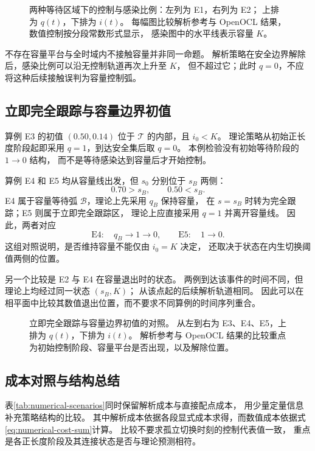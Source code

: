 \begin{figure}[H]
\centering
{}
\caption{两种等待区域下的控制与感染比例：左列为 E1，右列为 E2；
上排为 $q(t)$，下排为 $i(t)$。
每幅图比较解析参考与 OpenOCL 结果，数值控制按分段常数形式显示，
感染图中的水平线表示容量 $K$。}
\label{fig:numerical-waiting}
\end{figure}

\NumFindingParagraph{\NumFindingWaiting}

不存在容量平台与全时域内不接触容量并非同一命题。
解析策略在安全边界解除后，感染比例可以沿无控制轨道再次上升至 $K$，
但不超过它；此时 $q=0$，不应将这种后续接触误判为容量控制弧。

\subsection{立即完全跟踪与容量边界初值}

算例 E3 的初值 $(0.50,0.14)$ 位于 $\mathcal T$ 的内部，且 $i_0<K$。
理论策略从初始正长度阶段起即采用 $q=1$，到达安全集后取 $q=0$。
本例检验没有初始等待阶段的 $1\to0$ 结构，
而不是等待感染达到容量后才开始控制。

算例 E4 和 E5 均从容量线出发，但 $s_0$ 分别位于 $s_B$ 两侧：
\[
 0.70>s_B,\qquad 0.50<s_B.
\]
E4 属于容量等待弧 $\mathcal B$，理论上先采用 $q_B$ 保持容量，
在 $s=s_B$ 时转为完全跟踪；E5 则属于立即完全跟踪区，
理论上应直接采用 $q=1$ 并离开容量线。
因此，两者对应
\[
 \mathrm{E4}:\quad q_B\to1\to0,
 \qquad
 \mathrm{E5}:\quad 1\to0.
\]
这组对照说明，是否维持容量不能仅由 $i_0=K$ 决定，
还取决于状态在内生切换阈值两侧的位置。

另一个比较是 E2 与 E4 在容量退出时的状态。
两例到达该事件的时间不同，但理论上均经过同一状态 $(s_B,K)$；
从该点起的后续解析轨道相同。
因此可以在相平面中比较其数值退出位置，而不要求不同算例的时间序列重合。

\begin{figure}[H]
\centering
{}
\caption{立即完全跟踪与容量边界初值的对照。
从左到右为 E3、E4、E5，上排为 $q(t)$，下排为 $i(t)$。
解析参考与 OpenOCL 结果的比较重点为初始控制阶段、容量平台是否出现，以及解除位置。}
\label{fig:numerical-boundary-tracking}
\end{figure}

\NumFindingParagraph{\NumFindingTrackingBoundary}

\subsection{成本对照与结构总结}

表\ref{tab:numerical-scenarios}同时保留解析成本与直接配点成本，
用少量定量信息补充策略结构的比较。
其中解析成本依据各段显式成本求得，而数值成本依据式
\eqref{eq:numerical-cost-sum}计算。
比较不要求孤立切换时刻的控制代表值一致，
重点是各正长度阶段及其连接状态是否与理论预测相符。

\NumFindingParagraph{\NumOverallFinding}
\FloatBarrier
